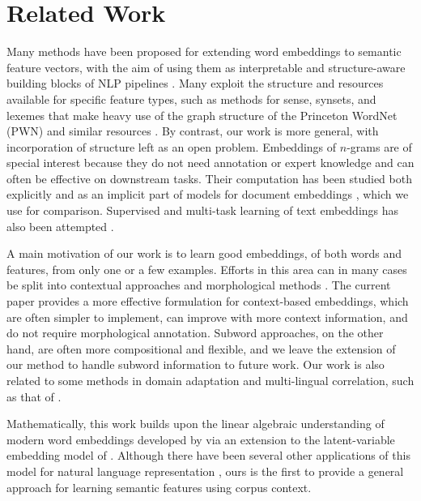 \documentclass[11pt,a4paper]{article}
\begin{document}
\section{Related Work}\label{sec:related}

Many methods have been proposed for extending word embeddings to semantic feature vectors, with the aim of using them as interpretable and structure-aware building blocks of NLP pipelines \cite{Kiros:15,Yamada:16}.
Many exploit the structure and resources available for specific feature types, such as methods for sense, synsets, and lexemes \cite{Rothe:15,Iacobacci:15} that make heavy use of the graph structure of the Princeton WordNet (PWN) and similar resources \cite{Fellbaum:98}.
By contrast, our work is more general, with incorporation of structure left as an open problem.
Embeddings of $n$-grams are of special interest because they do not need annotation or expert knowledge and can often be effective on downstream tasks.
Their computation has been studied both explicitly \cite{Yin:14,Poliak:17} and as an implicit part of models for document embeddings \cite{Hill:16,Pagliardini:18}, which we use for comparison.
Supervised and multi-task learning of text embeddings has also been attempted \cite{Wang:17,Wu:17}.

A main motivation of our work is to learn good embeddings, of both words and features, from only one or a few examples.
Efforts in this area can in many cases be split into contextual approaches \cite{Lazaridou:17,Herbelot:17} and morphological methods \cite{Luong:13,Bojanowski:16,Pado:16}.
The current paper provides a more effective formulation for context-based embeddings, which are often simpler to implement, can improve with more context information, and do not require morphological annotation.
Subword approaches, on the other hand, are often more compositional and flexible, and we leave the extension of our method to handle subword information to future work. 
Our work is also related to some methods in domain adaptation and multi-lingual correlation, such as that of \citet{Bollegala:14}.

Mathematically, this work builds upon the linear algebraic understanding of modern word embeddings developed by \citet{Arora:18b} via an extension to the latent-variable embedding model of \citet{Arora:16}.
Although there have been several other applications of this model for natural language representation \cite{Arora:17,Mu:18}, ours is the first to provide a general approach for learning semantic features using corpus context. 
\end{document}
